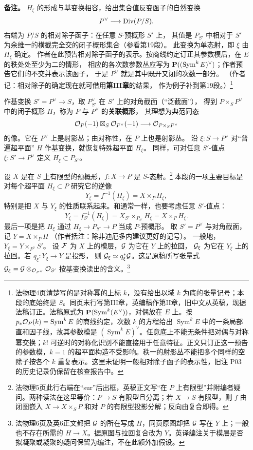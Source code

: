 \noindent\textbf{备注。}
\(H_\xi\) 的形成与基变换相容，给出集合值反变函子的自然变换
\[
 P^\vee\longrightarrow \operatorname{Div}(P/S).
\]
右端为 \(P/S\) 的相对除子函子：在任意 \(S\)-预概形 \(S'\) 上，
其值是 \(P_{S'}\) 中相对于 \(S'\) 为余维一的横截完全交的闭子概形集合（参看第19段）。
此变换为单态射，即 \(\xi\) 由 \(H_\xi\) 确定。
作者在此预告相对除子函子的表示。按商线约定订正其参数模后，在 $E$ 的秩处处至少为二的情形，
相应的各次数参数丛应写为 $\mathbf P((\operatorname{Sym}^k E)^\vee)$；作者预告它们的不交并表示该函子，
于是 \(P^\vee\) 就是其中既开又闭的次数一部分。
（作者记：相对除子的确定现在就可借用\textbf{第III章}的结果，
作为例子补到第19段。）\footnote{法物理4页清楚写的是对称幂的上标 \(k\)，没有给出以域 \(k\) 为底的张量记号；本段的底始终是 \(S\)。同页末行写第III章，英编稿作第II章，旧中文从英稿，现据法稿订正。法稿原式为 \(\mathbf P(\operatorname{Sym}^k(E^\vee))\)，对偶放在 $E$ 上。按 $p_*\mathcal O_P(k)=\operatorname{Sym}^k E$ 的商线约定，次数 $k$ 的方程给出 $\operatorname{Sym}^k E$ 中的一条局部直和因子线，故其参数模是 $(\operatorname{Sym}^k E)^\vee$。任意底上不能无条件把对偶与对称幂交换；$k!$ 可逆时的对称化识别不能直接用于任意特征。正文只订正这一预告的参数模，$k=1$ 的超平面构造不受影响。秩一的射影丛不能把多个同样的空除子按各个 \(k\) 重复表示。这里未证明一般相对除子函子的表示性，旧注 P03 的历史记录仍保留在核查报告中。}

作基变换 \(S'=P^\vee\to S\)，取 \(P^\vee_{S'}\) 在 \(S'\) 上的对角截面（“泛截面”），
得到 \(P\times_S P^\vee\) 中的闭子概形 \(H\)，称为 \(P\) 与 \(P^\vee\) 的\textbf{关联概形}，
其理想为典范同态
\[
 \mathcal O_P(-1)\boxtimes_S\mathcal O_{P^\vee}(-1)
 \longrightarrow \mathcal O_{P\times_S P^\vee}
\]
的像。它在 \(P^\vee\) 上是射影丛；由对称性，在 \(P\) 上也是射影丛。
沿 \(\xi:S\to P^\vee\) 对“普遍超平面” \(H\) 作基变换，就恢复特殊超平面 \(H_\xi\)。
同样，可对任意 \(S'\)-值点 \(\xi:S'\to P^\vee\) 定义 \(H_\xi\subset P_{S'}\)。

设 \(X\) 是在 \(S\) 上有限型的预概形，\(f:X\to P\) 是 \(S\)-态射。\footnote{法物理5页此行右端在“sur”后出框，英稿正文写“在 \(P\) 上有限型”并附编者疑问。两种读法在这里等价：\(P\to S\) 有限型且分离；若 \(X\to S\) 有限型，则 \(f\) 由闭图嵌入 \(X\to X\times_S P\) 和对 \(P\) 的有限型投影分解；反向由复合即得。}
本段的一项主要目标是对每个超平面 \(H_\xi\subset P\) 研究它的逆像
\[
 Y_\xi=f^{-1}(H_\xi)=X\times_P H_\xi,
\]
特别是把 \(X\) 与 \(Y_\xi\) 的性质联系起来。和通常一样，也要考虑任意 \(S'\)-值点：
\[
 Y_\xi=f_{S'}^{-1}(H_\xi)=X_{S'}\times_{P_{S'}}H_\xi
       =X\times_P H_\xi .
\]
最后一项是把 \(H_\xi\) 通过 \(H_\xi\to P_{S'}\to P\) 当成 \(P\)-预概形。
取 \(S'=P^\vee\) 与对角截面，记 \(Y=X\times_P H\)
（作者括注：除非迪厄多内建议更好的记号）。
一般地，\(Y_\xi=Y\times_{P^\vee}S'\)。
设 \(\mathcal F\) 为 \(X\) 上的模层，\(\mathcal G\) 为它在 \(Y\) 上的拉回，
\(\mathcal G_\xi\) 为它在 \(Y_\xi\) 上的拉回。若 \(q_\xi:Y_\xi\to Y\) 是投影，
则 \(\mathcal G_\xi\simeq q_\xi^*\mathcal G\)。这是原稿所写张量式
\(\mathcal G_\xi=\mathcal G\otimes_{\mathcal O_{P^\vee}}\mathcal O_{S'}\) 按基变换读出的含义。\footnote{法物理6页及英6正文都把 \(\mathcal G\) 的所在写成 \(H\)，同页原图却把 \(\mathcal G\) 写在 \(Y\) 上；一般也不存在所需的 \(H\to X\)。据原图与拉回复合改为 \(Y\)。英译编注关于模层是否拟凝聚或凝聚的疑问保留为编注，不在此额外加假设。}

